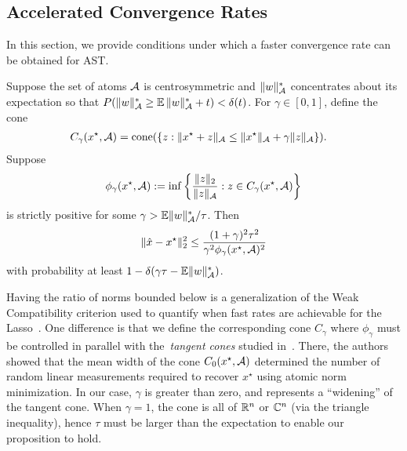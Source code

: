 \subsection{Accelerated Convergence Rates}\label{sec:convergence-rate}
In this section, we provide conditions under which a faster convergence rate
can be obtained for AST.
\begin{prop}
Suppose the set of atoms $\mathcal{A}$ is centrosymmetric and $\lVert w\rVert_{\mathcal{A}}^*$
concentrates about its expectation so that $P( {\lVert w\rVert_{\mathcal{A}}^*} \geq
\operatorname{\mathbb{E}}{\lVert w\rVert_{\mathcal{A}}^*}+t) < \delta(t)$. For $\gamma \in [0, 1]$, define the cone
\begin{align*}
C_\gamma(x^\star,\mathcal{A}) &= \operatorname{cone}(\{z:\lVert x^\star+ z\rVert_{\mathcal{A}} \leq \lVert x^\star\rVert_{\mathcal{A}} + \gamma\lVert z\rVert_{\mathcal{A}}\}).
\end{align*}
Suppose 
\begin{equation}
\label{eq:compatibility}
\phi_\gamma(x^\star,\mathcal{A}) := \inf \left\{ \frac{\lVert z\rVert_{2}}{\lVert z\rVert_{\mathcal{A}}}  : z \in C_\gamma(x^\star,\mathcal{A}) \right\} 
\end{equation}
is strictly positive for some $\gamma > {\operatorname{\mathbb{E}}\lVert w\rVert_{\mathcal{A}}^*}/{\tau}$. Then
\begin{equation}
\label{eq:fast_rate_phi}
\lVert\hat{x}-x^\star\rVert_2^2  \leq \frac{(1+\gamma)^2 \tau^2}{\gamma^2 \phi_\gamma(x^\star,\mathcal{A})^2}
\end{equation}
with probability at least $1-\delta(\gamma\tau - \operatorname{\mathbb{E}}\lVert w\rVert_{\mathcal{A}}^*)$.
\end{prop}

Having the ratio of norms bounded below is a generalization of the Weak
Compatibility criterion used to quantify when fast rates are achievable for the
Lasso~\cite{degeer}. One difference is that we define the corresponding
cone $C_\gamma$ where $\phi_\gamma$ must be controlled in parallel with
the~\emph{tangent cones} studied in~\cite{crpw}. There, the authors showed that
the mean width of the cone $C_0(x^\star,\mathcal{A})$ determined the number of random
linear measurements required to recover $x^\star$ using atomic norm
minimization. In our case, $\gamma$ is greater than zero, and represents a
``widening'' of the tangent cone. When $\gamma=1$, the cone is all of $\mathbb{R}^n$ or $\mathbb{C}^n$
(via the triangle inequality), hence $\tau$ must be larger than the
expectation to enable our proposition to hold.

